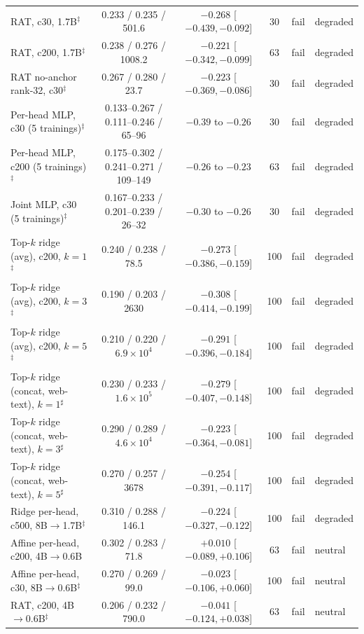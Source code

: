 \documentclass[10pt]{article}
\begin{document}
\begin{table}[t]
{\begin{tabular}{lccccl}
RAT, c30, 1.7B$^{\ddagger}$ & 0.233 / 0.235 / 501.6 & $-0.268$ [$-0.439, -0.092$] & 30 & fail & degraded \\
RAT, c200, 1.7B$^{\ddagger}$ & 0.238 / 0.276 / 1008.2 & $-0.221$ [$-0.342, -0.099$] & 63 & fail & degraded \\
RAT no-anchor rank-32, c30$^{\ddagger}$ & 0.267 / 0.280 / 23.7 & $-0.223$ [$-0.369, -0.086$] & 30 & fail & degraded \\
Per-head MLP, c30 (5 trainings)$^{\ddagger}$ & 0.133--0.267 / 0.111--0.246 / 65--96 & $-0.39$ to $-0.26$ & 30 & fail & degraded \\
Per-head MLP, c200 (5 trainings)$^{\ddagger}$ & 0.175--0.302 / 0.241--0.271 / 109--149 & $-0.26$ to $-0.23$ & 63 & fail & degraded \\
Joint MLP, c30 (5 trainings)$^{\ddagger}$ & 0.167--0.233 / 0.201--0.239 / 26--32 & $-0.30$ to $-0.26$ & 30 & fail & degraded \\
Top-$k$ ridge (avg), c200, $k{=}1$$^{\ddagger}$ & 0.240 / 0.238 / 78.5 & $-0.273$ [$-0.386, -0.159$] & 100 & fail & degraded \\
Top-$k$ ridge (avg), c200, $k{=}3$$^{\ddagger}$ & 0.190 / 0.203 / 2630 & $-0.308$ [$-0.414, -0.199$] & 100 & fail & degraded \\
Top-$k$ ridge (avg), c200, $k{=}5$$^{\ddagger}$ & 0.210 / 0.220 / $6.9\times10^{4}$ & $-0.291$ [$-0.396, -0.184$] & 100 & fail & degraded \\
Top-$k$ ridge (concat, web-text), $k{=}1$$^{\sharp}$ & 0.230 / 0.233 / $1.6\times10^{5}$ & $-0.279$ [$-0.407, -0.148$] & 100 & fail & degraded \\
Top-$k$ ridge (concat, web-text), $k{=}3$$^{\sharp}$ & 0.290 / 0.289 / $4.6\times10^{4}$ & $-0.223$ [$-0.364, -0.081$] & 100 & fail & degraded \\
Top-$k$ ridge (concat, web-text), $k{=}5$$^{\sharp}$ & 0.270 / 0.257 / 3678 & $-0.254$ [$-0.391, -0.117$] & 100 & fail & degraded \\
Ridge per-head, c500, 8B$\to$1.7B$^{\ddagger}$ & 0.310 / 0.288 / 146.1 & $-0.224$ [$-0.327, -0.122$] & 100 & fail & degraded \\
Affine per-head, c200, 4B$\to$0.6B & 0.302 / 0.283 / 71.8 & $+0.010$ [$-0.089, +0.106$] & 63 & fail & neutral \\
Affine per-head, c30, 8B$\to$0.6B$^{\ddagger}$ & 0.270 / 0.269 / 99.0 & $-0.023$ [$-0.106, +0.060$] & 100 & fail & neutral \\
RAT, c200, 4B$\to$0.6B$^{\ddagger}$ & 0.206 / 0.232 / 790.0 & $-0.041$ [$-0.124, +0.038$] & 63 & fail & neutral \\

\end{tabular}}
\end{table}
\end{document}

